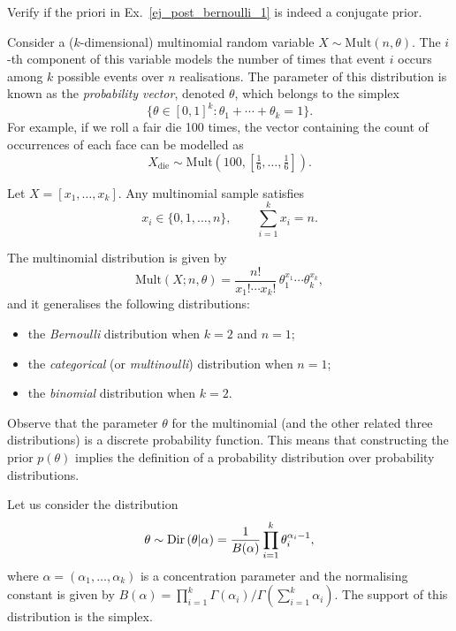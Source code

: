 \begin{example}
\label{ej_post_bernoulli_2}
Verify if the priori in Ex.~\ref{ej_post_bernoulli_1} is indeed a conjugate prior. 
\end{example}

\begin{example}
Consider a ($k$-dimensional) multinomial random variable \(X \sim \mathrm{Mult}(n,\theta)\). The \(i\)-th component of this variable models the number of times that
event \(i\) occurs among \(k\) possible events over \(n\) realisations. The parameter of this distribution is known as the \emph{probability vector}, denoted \(\theta\), which belongs to the simplex
\[
\{\theta \in [0,1]^k : \theta_1 + \cdots + \theta_k = 1\}.
\]
For example, if we roll a fair die 100 times, the vector containing the
count of occurrences of each face can be modelled as
\[
X_{\text{die}} \sim \mathrm{Mult}\!\left(100,
  \left[\tfrac{1}{6}, \ldots, \tfrac{1}{6}\right]\right).
\]

Let \(X = [x_1,\ldots,x_k]\). Any multinomial sample satisfies
\[
x_i \in \{0,1,\ldots,n\}, \qquad \sum_{i=1}^k x_i = n.
\]

The multinomial distribution is given by
\[
\mathrm{Mult}(X; n, \theta)
  = \frac{n!}{x_1! \cdots x_k!}\,
    \theta_1^{x_1} \cdots \theta_k^{x_k},
\]
and it generalises the following distributions:
\begin{itemize}
  \item the \emph{Bernoulli} distribution when \(k = 2\) and \(n = 1\);
  \item the \emph{categorical} (or \emph{multinoulli}) distribution when \(n = 1\);
  \item the \emph{binomial} distribution when \(k = 2\).
\end{itemize}

\end{example}
Observe that the parameter $\theta$ for the multinomial (and the other related three distributions) is a discrete probability function. This means that constructing the prior $p(\theta)$ implies the definition of a probability distribution over probability distributions.  


\begin{definition}
Let us consider the distribution 
\begin{equation}
	\theta \sim \text{Dir}\left(\theta|\alpha\right) = \frac{1}{B(\alpha)} \prod_{i=1}^k \theta_i^{\alpha_i-1},
\end{equation}
where $\alpha = (\alpha_1,\ldots,\alpha_k)$ is a concentration parameter and the normalising constant is given by  $B(\alpha)=\prod_{i=1}^k\Gamma(\alpha_i)/\Gamma(\sum_{i=1}^k\alpha_i)$. The support of this distribution is the simplex.
\end{definition}

